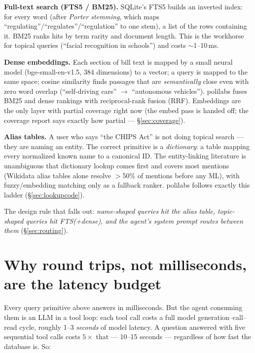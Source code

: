 \documentclass[11pt]{article}
\begin{document}
\textbf{Full-text search (FTS5 / BM25).} SQLite's FTS5 builds an inverted
index: for every word (after \emph{Porter stemming}, which maps
``regulating''/``regulates''/``regulation'' to one stem), a list of the rows
containing it. BM25 ranks hits by term rarity and document length. This is the
workhorse for topical queries (``facial recognition in schools'') and costs
$\sim$1--10\,ms.

\textbf{Dense embeddings.} Each section of bill text is mapped by a small
neural model (bge-small-en-v1.5, 384 dimensions) to a vector; a query is
mapped to the same space; cosine similarity finds passages that are
\emph{semantically} close even with zero word overlap (``self-driving cars''
$\to$ ``autonomous vehicles''). polilabs fuses BM25 and dense rankings with
reciprocal-rank fusion (RRF). Embeddings are the only layer with partial
coverage right now (the embed pass is handed off; the coverage report says
exactly how partial --- \S\ref{sec:coverage}).

\textbf{Alias tables.} A user who says ``the CHIPS Act'' is not doing topical
search --- they are naming an entity. The correct primitive is a
\emph{dictionary}: a table mapping every normalized known name to a canonical
ID. The entity-linking literature is unambiguous that dictionary lookup comes
first and covers most mentions (Wikidata alias tables alone resolve
$>$50\% of mentions before any ML), with fuzzy/embedding matching only as a
fallback ranker. polilabs follows exactly this ladder
(\S\ref{sec:lookupcode}).

The design rule that falls out: \emph{name-shaped queries hit the alias
table, topic-shaped queries hit FTS(+dense), and the agent's system prompt
routes between them} (\S\ref{sec:routing}).

\section{Why round trips, not milliseconds, are the latency budget}
\label{sec:latency}

Every query primitive above answers in milliseconds. But the agent consuming
them is an LLM in a tool loop: each tool call costs a full model
generation--call--read cycle, roughly 1--3 \emph{seconds} of model latency.
A question answered with five sequential tool calls costs $5\times$ that ---
10--15 seconds --- regardless of how fast the database is. So:

\begin{center}
\end{center}
\end{document}
